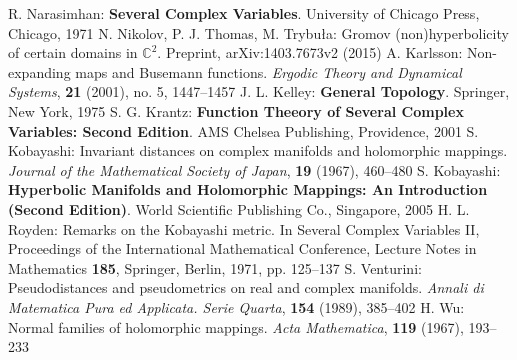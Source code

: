\begin{thebibliography}{widest entry}
   R. Narasimhan: \textbf{Several Complex Variables}. University of Chicago Press, Chicago, 1971
   N. Nikolov, P. J. Thomas, M. Trybuła: Gromov (non)hyperbolicity of certain domains in $\mathbb{C}^2$. Preprint, arXiv:1403.7673v2 (2015)
   A. Karlsson: Non-expanding maps and Busemann functions. \textit{Ergodic Theory and Dynamical Systems}, \textbf{21} (2001), no. 5, 1447--1457
   J. L. Kelley: \textbf{General Topology}. Springer, New York, 1975
   S. G. Krantz: \textbf{Function Theeory of Several Complex Variables: Second Edition}. AMS Chelsea Publishing, Providence, 2001
   S. Kobayashi: Invariant distances on complex manifolds and holomorphic mappings. \textit{Journal of the Mathematical Society of Japan}, \textbf{19} (1967), 460--480
   S. Kobayashi: \textbf{Hyperbolic Manifolds and Holomorphic Mappings: An Introduction (Second Edition)}. World Scientific Publishing Co., Singapore, 2005
   H. L. Royden: Remarks on the Kobayashi metric. In Several Complex Variables II, Proceedings of the International Mathematical Conference, Lecture Notes in Mathematics \textbf{185}, Springer, Berlin, 1971, pp. 125--137
   S. Venturini: Pseudodistances and pseudometrics on real and complex manifolds. \textit{Annali di Matematica Pura ed Applicata. Serie Quarta}, \textbf{154} (1989), 385--402
   H. Wu: Normal families of holomorphic mappings. \textit{Acta Mathematica}, \textbf{119} (1967), 193--233
\end{thebibliography}

